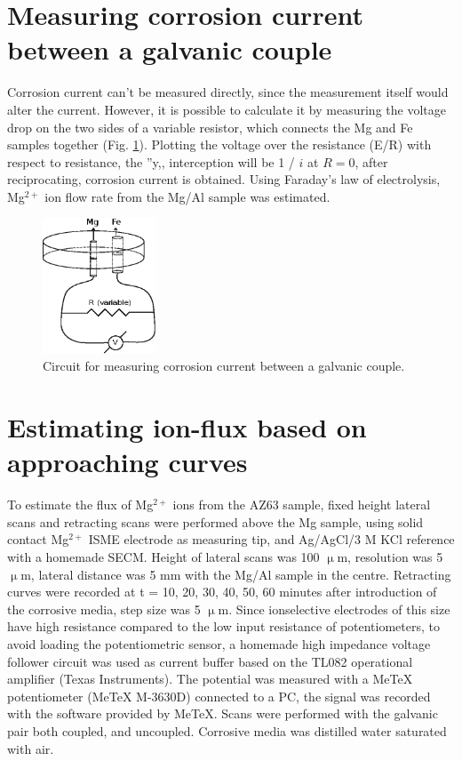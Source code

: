 	\section{Measuring corrosion current between a galvanic couple}
Corrosion current can't be measured directly, since the measurement itself would alter the current.
However, it is possible to calculate it by measuring the voltage drop on the two sides of a variable resistor, which connects the Mg and Fe samples together (Fig. \ref{fig:corrosion_current}).
Plotting the voltage over the resistance (E/R) with respect to resistance, the ''y,, interception will be 1 / $i$ at $R=0$, after reciprocating, corrosion current is obtained.
Using Faraday's law of electrolysis, Mg$^{2+}$ ion flow rate from the Mg/Al sample was estimated.

\begin{figure}
\centering
\includegraphics[width=0.3\textwidth]{img/corrosion_current.eps}
\caption[Circuit for measuring corrosion current between a galvanic couple.]{Circuit for measuring corrosion current between a galvanic couple.}

\label{fig:corrosion_current}
\end{figure}


	\section{Estimating ion-flux based on approaching curves}
To estimate the flux of Mg$^{2+}$ ions from the AZ63 sample, fixed height lateral scans and retracting scans were performed above the Mg sample, using solid contact Mg$^{2+}$ ISME electrode as measuring tip, and Ag/AgCl/3 M KCl reference with a homemade SECM.
Height of lateral scans was 100 $\upmu$m, resolution was 5 $\upmu$m, lateral distance was 5 mm with the Mg/Al sample in the centre.
Retracting curves were recorded at t = 10, 20, 30, 40, 50, 60 minutes after introduction of the corrosive media, step size was 5 $\upmu$m.
Since ionselective electrodes of this size have high resistance compared to the low input resistance of potentiometers, to avoid loading the potentiometric sensor, a homemade high impedance voltage follower circuit was used as current buffer based on the TL082 operational amplifier (Texas Instruments).
The potential was measured with a MeTeX potentiometer (MeTeX M-3630D) connected to a PC, the signal was recorded with the software provided by MeTeX.
Scans were performed with the galvanic pair both coupled, and uncoupled.
Corrosive media was distilled water saturated with air.
